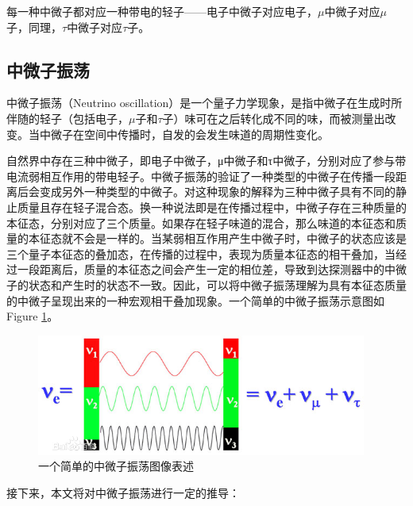 \documentclass[10pt,a4paper]{article}
\begin{document}
每一种中微子都对应一种带电的轻子——电子中微子对应电子，$\mu$中微子对应$\mu$子，同理，$\tau$中微子对应$\tau$子。

\newpage

\subsection{中微子振荡}\label{sub:01}


中微子振荡（Neutrino oscillation）是一个量子力学现象，是指中微子在生成时所伴随的轻子（包括电子，$\mu$子和$\tau$子）味可在之后转化成不同的味，而被测量出改变。当中微子在空间中传播时，自发的会发生味道的周期性变化。

自然界中存在三种中微子，即电子中微子，μ中微子和τ中微子，分别对应了参与带电流弱相互作用的带电轻子。中微子振荡的验证了一种类型的中微子在传播一段距离后会变成另外一种类型的中微子。对这种现象的解释为三种中微子具有不同的静止质量且存在轻子混合态。换一种说法即是在传播过程中，中微子存在三种质量的本征态，分别对应了三个质量。如果存在轻子味道的混合，那么味道的本征态和质量的本征态就不会是一样的。当某弱相互作用产生中微子时，中微子的状态应该是三个量子本征态的叠加态，在传播的过程中，表现为质量本征态的相干叠加，当经过一段距离后，质量的本征态之间会产生一定的相位差，导致到达探测器中的中微子的状态和产生时的状态不一致。因此，可以将中微子振荡理解为具有本征态质量的中微子呈现出来的一种宏观相干叠加现象。一个简单的中微子振荡示意图如Figure \ref{fig:10}。


\begin{figure}[H]
 \centering
 \includegraphics[height=4cm]{images/中微子振荡示意图.jpg}
 \caption{一个简单的中微子振荡图像表述\cite{pic1}}
 \label{fig:10}
\end{figure}

接下来，本文将对中微子振荡进行一定的推导\cite{2007fun}\cite{2016Neutrino}\cite{2019Physics}：
\end{document}
